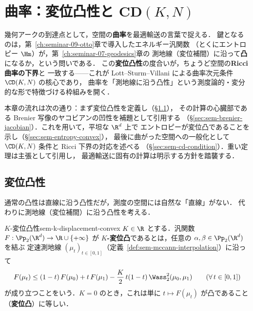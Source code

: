 \chapter{曲率：変位凸性と CD$(K,N)$}
\label{ch:seminar-10-curvature}

幾何アークの到達点として，空間の\textbf{曲率}を最適輸送の言葉で捉える．
鍵となるのは，第~\ref{ch:seminar-09-otto}章で導入したエネルギー汎関数
（とくにエントロピー $\Hm$）が，第~\ref{ch:seminar-07-geodesics}章の
測地線（変位補間）に沿って\textbf{凸}になるか，という問いである．
この\textbf{変位凸性}の度合いが，ちょうど空間の\textbf{Ricci 曲率の下界}と
一致する——これが Lott--Sturm--Villani による曲率次元条件 $\CD(K,N)$ の核心であり，
曲率を「測地線に沿う凸性」という測度論的・変分的な形で特徴づける枠組みを開く．

本章の流れは次の通り：まず変位凸性を定義し（§\ref{sec:sem-displacement-convexity}），
その計算の心臓部である Brenier 写像のヤコビアンの凹性を補題として引用する
（§\ref{sec:sem-brenier-jacobian}）．これを用いて，平坦な $\R^d$ 上で
エントロピーが変位凸であることを示し（§\ref{sec:sem-entropy-convex}），
最後に曲がった空間への一般化として $\CD(K,N)$ 条件と Ricci 下界の対応を述べる
（§\ref{sec:sem-cd-condition}）．重い定理は主張として引用し，
最適輸送に固有の計算は明示する方針を踏襲する．

\section{変位凸性}
\label{sec:sem-displacement-convexity}

通常の凸性は直線に沿う凸性だが，測度の空間には自然な「直線」がない．
代わりに測地線（変位補間）に沿う凸性を考える．

\begin{definition}{$K$-変位凸性}{sem-k-displacement-convex}
  $K\in\R$ とする．汎関数 $F:\Pp_2(\R^d)\to\R\cup\{+\infty\}$ が
  \textbf{$K$-変位凸}であるとは，任意の $\alpha,\beta\in\Pp_2(\R^d)$ を結ぶ
  定速測地線 $(\mu_t)_{t\in[0,1]}$（定義~\ref{def:sem-mccann-interpolation}）に沿って
  \[
    F(\mu_t)
    \le (1-t)\,F(\mu_0) + t\,F(\mu_1)
      - \frac{K}{2}\,t(1-t)\,\Wass_2^2(\mu_0,\mu_1)
    \qquad (\forall\, t\in[0,1])
  \]
  が成り立つことをいう．$K=0$ のとき，これは単に
  $t\mapsto F(\mu_t)$ が凸であること（\textbf{変位凸}）に等しい．
\end{definition}

